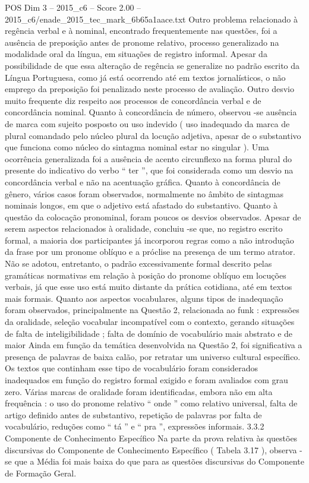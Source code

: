\begin{textsample}{POS Dim 3 – 2015\_c6 – Score 2.00 – 2015\_c6/enade\_2015\_tec\_mark\_6b65a1aace.txt}
Outro problema relacionado à regência verbal e à nominal, encontrado frequentemente nas questões, foi a ausência de preposição antes de pronome relativo, processo generalizado na modalidade oral da língua, em situações de registro informal.
Apesar da possibilidade de que essa alteração de regência se generalize no padrão escrito da Língua Portuguesa, como já está ocorrendo até em textos jornalísticos, o não emprego da preposição foi penalizado neste processo de avaliação.
Outro desvio muito frequente diz respeito aos processos de concordância verbal e de concordância nominal.
Quanto à concordância de número, observou -se ausência de marca com sujeito posposto ou uso indevido ( uso inadequado da marca de plural comandado pelo núcleo plural da locução adjetiva, apesar de o substantivo que funciona como núcleo do sintagma nominal estar no singular ).
Uma ocorrência generalizada foi a ausência de acento circunflexo na forma plural do presente do indicativo do verbo “ ter ”, que foi considerada como um desvio na concordância verbal e não na acentuação gráfica.
Quanto à concordância de gênero, vários casos foram observados, normalmente no âmbito de sintagmas nominais longos, em que o adjetivo está afastado do substantivo.
Quanto à questão da colocação pronominal, foram poucos os desvios observados.
Apesar de serem aspectos relacionados à oralidade, concluiu -se que, no registro escrito formal, a maioria dos participantes já incorporou regras como a não introdução da frase por um pronome oblíquo e a próclise na presença de um termo atrator.
Não se adotou, entretanto, o padrão excessivamente formal descrito pelas gramáticas normativas em relação à posição do pronome oblíquo em locuções verbais, já que esse uso está muito distante da prática cotidiana, até em textos mais formais.
Quanto aos aspectos vocabulares, alguns tipos de inadequação foram observados, principalmente na Questão 2, relacionada ao funk : expressões da oralidade, seleção vocabular incompatível com o contexto, gerando situações de falta de inteligibilidade ; falta de domínio de vocabulário mais abstrato e de maior Ainda em função da temática desenvolvida na Questão 2, foi significativa a presença de palavras de baixa calão, por retratar um universo cultural específico.
Os textos que continham esse tipo de vocabulário foram considerados inadequados em função do registro formal exigido e foram avaliados com grau zero.
Várias marcas de oralidade foram identificadas, embora não em alta frequência : o uso do pronome relativo “ onde ” como relativo universal, falta de artigo definido antes de substantivo, repetição de palavras por falta de vocabulário, reduções como “ tá ” e “ pra ”, expressões informais. 3.3.2 Componente de Conhecimento Específico Na parte da prova relativa às questões discursivas do Componente de Conhecimento Específico ( Tabela 3.17 ), observa -se que a Média foi mais baixa do que para as questões discursivas do Componente de Formação Geral.

\end{textsample}
